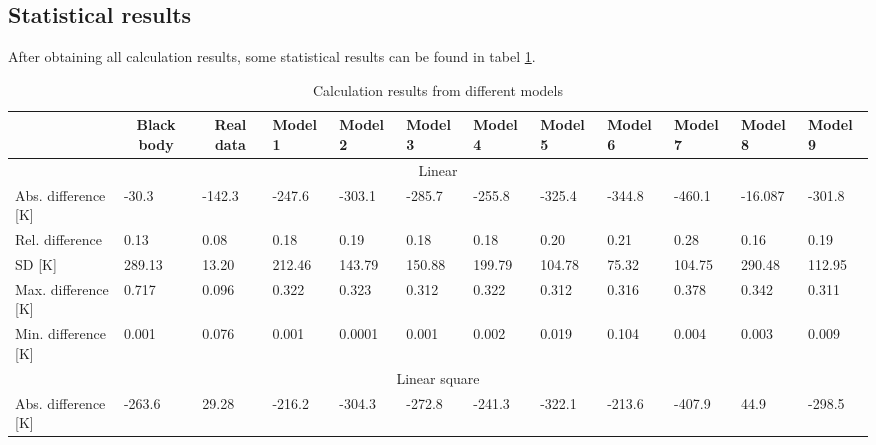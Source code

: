 \subsection{Statistical results}

After obtaining all calculation results, some statistical results can be found in 
tabel \ref{tab: statistic_results}. 

\begin{table}
    \centering
    \caption{Calculation results from different models}
    \label{tab: statistic_results}
    \begin{tabular}{llllllllllll}
        \hline
        & \multicolumn{1}{c}{Black body} & \multicolumn{1}{c}{Real data} & Model 1 & Model 2 & Model 3 & Model 4 & Model 5 & Model 6 & Model 7 & Model 8 & Model 9 \\ \hline
        \multicolumn{12}{c}{Linear}                                                                                                                                                        \\ \hline
        Abs. difference {[}K{]} & -30.3                          & -142.3                        & -247.6  & -303.1  & -285.7  & -255.8  & -325.4  & -344.8  & -460.1  & -16.087 & -301.8  \\
        Rel. difference         & 0.13                           & 0.08                          & 0.18    & 0.19    & 0.18    & 0.18    & 0.20    & 0.21    & 0.28    & 0.16    & 0.19    \\
        SD {[}K{]}              & 289.13                         & 13.20                         & 212.46  & 143.79  & 150.88  & 199.79  & 104.78  & 75.32   & 104.75  & 290.48  & 112.95  \\
        Max. difference {[}K{]} & 0.717                          & 0.096                         & 0.322   & 0.323   & 0.312   & 0.322   & 0.312   & 0.316   & 0.378   & 0.342   & 0.311   \\
        Min. difference {[}K{]} & 0.001                          & 0.076                         & 0.001   & 0.0001  & 0.001   & 0.002   & 0.019   & 0.104   & 0.004   & 0.003   & 0.009   \\ \hline
        \multicolumn{12}{c}{Linear square}                                                                                                                                                     \\ \hline
        Abs. difference {[}K{]} & -263.6                         & 29.28                         & -216.2  & -304.3  & -272.8  & -241.3  & -322.1  & -213.6  & -407.9  & 44.9    & -298.5  \\

\end{tabular}
\end{table}
